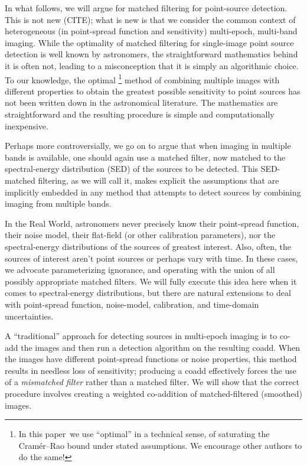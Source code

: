 \documentclass[letterpaper,preprint]{aastex62}
\newcommand{\doctype}{paper}
\begin{document}
In what follows, we will argue for matched filtering for point-source
detection.  This is not new (CITE); what is new is that we consider
the common context of heterogeneous (in point-spread function and
sensitivity) multi-epoch, multi-band imaging.
%
While the optimality of matched filtering for single-image point
source detection is well known by astronomers, the straightforward
mathematics behind it is often not, leading to a misconception that
it is simply an algorithmic choice.  To our knowledge, the optimal%
\footnote{In this \doctype\ we use ``optimal'' in a technical sense,
 of saturating the Cram\'er--Rao bound under stated assumptions.  We
 encourage other authors to do the same!}
method of combining multiple images with different properties to
obtain the greatest possible sensitivity to point sources has not been
written down in the astronomical literature.  The mathematics are
straightforward and the resulting procedure is simple and
computationally inexpensive.  

Perhaps more controversially, we go on to argue that when imaging in
multiple bands is available, one should again use a matched filter,
now matched to the spectral-energy distribution (SED) of the sources
to be detected.  This SED-matched filtering, as we will call it, makes
explicit the assumptions that are implicitly embedded in any method
that attempts to detect sources by combining imaging from multiple
bands.

In the Real World, astronomers never precisely know their point-spread
function, their noise model, their flat-field (or other calibration
parameters), nor the spectral-energy distributions of the sources of
greatest interest.
Also, often, the sources of interest aren't point sources or perhaps
vary with time.
In these cases, we advocate parameterizing ignorance, and operating
with the union of all possibly appropriate matched filters.
We will fully execute this idea here when it comes to spectral-energy
distributions, but there are natural extensions to deal with
point-spread function, noise-model, calibration, and time-domain
uncertainties.




A ``traditional'' approach for detecting sources in multi-epoch
imaging is to co-add the images and then run a detection algorithm on
the resulting coadd.  When the images have different point-spread
functions or noise properties, this method results in needless loss of
sensitivity; producing a coadd effectively forces the use of a
\emph{mismatched filter} rather than a matched filter.  We will show
that the correct procedure involves creating a weighted co-addition of
matched-filtered (smoothed) images.
\end{document}
